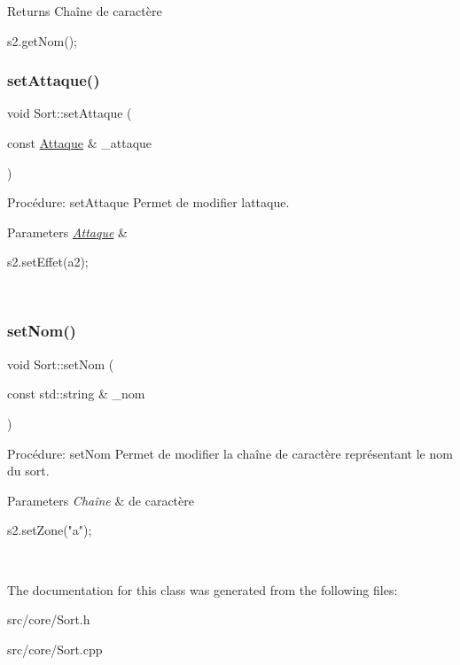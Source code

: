 \begin{DoxyReturn}{Returns}
Chaîne de caractère 
\begin{DoxyCode}
s2.getNom();
\end{DoxyCode}
 
\end{DoxyReturn}
\mbox{\label{classSort_ae8380b142e31fdad8afae89bbfaeffc5}} 
\subsubsection{\texorpdfstring{set\+Attaque()}{setAttaque()}}
{\footnotesize\ttfamily void Sort\+::set\+Attaque (\begin{DoxyParamCaption}\item[{const \hyperlink{classAttaque}{Attaque} \&}]{\+\_\+attaque }\end{DoxyParamCaption})}



Procédure\+: set\+Attaque Permet de modifier l\textquotesingle{}attaque. 


\begin{DoxyParams}{Parameters}
{\em \hyperlink{classAttaque}{Attaque}} & 
\begin{DoxyCode}
s2.setEffet(a2);
\end{DoxyCode}
 \\
\hline
\end{DoxyParams}
\mbox{\label{classSort_af1eb5e9ab593b1c6b9e1d94ad1117b4f}} 
\subsubsection{\texorpdfstring{set\+Nom()}{setNom()}}
{\footnotesize\ttfamily void Sort\+::set\+Nom (\begin{DoxyParamCaption}\item[{const std\+::string \&}]{\+\_\+nom }\end{DoxyParamCaption})}



Procédure\+: set\+Nom Permet de modifier la chaîne de caractère représentant le nom du sort. 


\begin{DoxyParams}{Parameters}
{\em Chaîne} & de caractère 
\begin{DoxyCode}
s2.setZone(\textcolor{stringliteral}{"a"});
\end{DoxyCode}
 \\
\hline
\end{DoxyParams}


The documentation for this class was generated from the following files\+:\begin{DoxyCompactItemize}
\item 
src/core/Sort.\+h\item 
src/core/Sort.\+cpp\end{DoxyCompactItemize}
